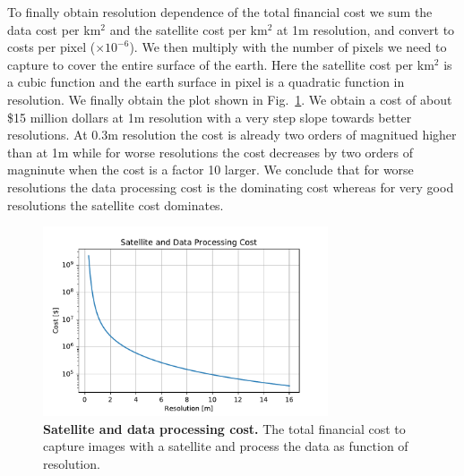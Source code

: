 To finally obtain resolution dependence of the total financial cost we sum the data cost per km$^2$ and the satellite cost per km$^2$ at 1m resolution, and convert to costs per pixel ($\times 10^{-6}$). We then multiply with the number of pixels we need to capture to cover the entire surface of the earth. Here the satellite cost per km$^2$ is a cubic function and the earth surface in pixel is a quadratic function in resolution. We finally obtain the plot shown in Fig.~\ref{fig:costs}. We obtain a cost of about \$15 million dollars at 1m resolution with a very step slope towards better resolutions. At 0.3m resolution the cost is already two orders of magnitued higher than at 1m while for worse resolutions the cost decreases by two orders of magninute when the cost is a factor 10 larger. We conclude that for worse resolutions the data processing cost is the dominating cost whereas for very good resolutions the satellite cost dominates.

\begin{figure}[h!]
	\centering
	\includegraphics[width=0.75\textwidth]{Figures/costs.pdf}
	\captionsetup{width=1\linewidth}
	\caption{\textbf{Satellite and data processing cost.} The total financial cost to capture images with a satellite and process the data as function of resolution.}
	\label{fig:costs}
\end{figure}

